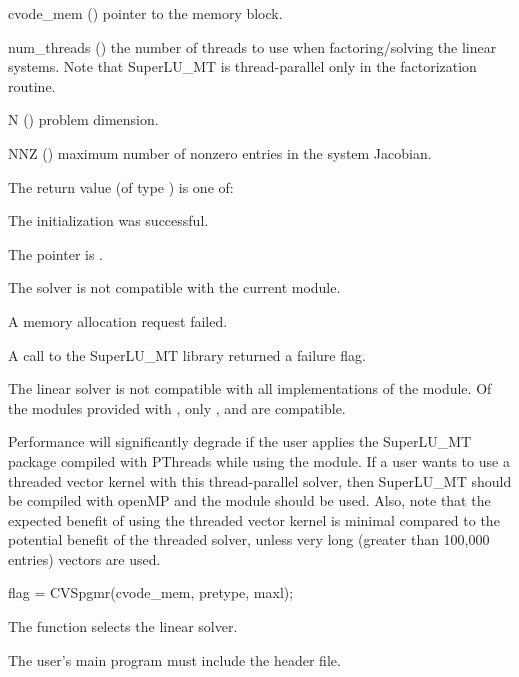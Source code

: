 {
  \begin{args}
  \item[cvode\_mem] ()
    pointer to the {\cvodes} memory block.
  \item[num\_threads] ()
    the number of threads to use when factoring/solving the linear systems.
    Note that SuperLU\_MT is thread-parallel only in the factorization routine.
  \item[N] ()
    problem dimension.
  \item[NNZ] ()
    maximum number of nonzero entries in the system Jacobian.
  \end{args}
}
{
  The return value  (of type ) is one of:
  \begin{args}
  \item[\Id{CVSLS\_SUCCESS}] 
    The {\cvsuperlumt} initialization was successful.
  \item[\Id{CVSLS\_MEM\_NULL}]
    The  pointer is .
  \item[\Id{CVSLS\_ILL\_INPUT}]
    The {\cvsuperlumt} solver is not compatible with the current {\nvector} module.
  \item[\Id{CVSLS\_MEM\_FAIL}]
    A memory allocation request failed.
  \item[\Id{CVSLS\_PACKAGE\_FAIL}]
    A call to the SuperLU\_MT library returned a failure flag.
  \end{args}
}
{
  The {\cvsuperlumt} linear solver is not compatible with all
  implementations of the {\nvector} module. 
  Of the {\nvector} modules provided with {\sundials}, only {\nvecs},
  {\nvecopenmp} and {\nvecpthreads} are compatible.

  {\warn}Performance will significantly degrade if the user applies the SuperLU\_MT
  package compiled with PThreads while using the {\nvecopenmp} module.
  If a user wants to use a threaded vector kernel with this thread-parallel
  solver, then SuperLU\_MT should be compiled with openMP and the {\nvecopenmp}
  module should be used.  Also, note that the expected benefit of using the threaded
  vector kernel is minimal compared to the potential benefit of the threaded solver,
  unless very long (greater than 100,000 entries) vectors are used.
}
{
  flag = CVSpgmr(cvode\_mem, pretype, maxl);
}
{
  The function  selects the {\cvspgmr} linear solver. 

  The user's main program must include the  header file.
}
